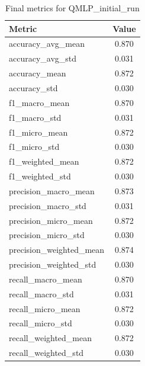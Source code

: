 \documentclass[runningheads]{llncs}
\begin{document}
\begin{table}[t]
\centering
\caption{Final metrics for QMLP\_initial\_run}
\begin{tabular}{lc}
\hline
Metric & Value \\
\hline
accuracy\_avg\_mean & 0.870 \\
accuracy\_avg\_std & 0.031 \\
accuracy\_mean & 0.872 \\
accuracy\_std & 0.030 \\
f1\_macro\_mean & 0.870 \\
f1\_macro\_std & 0.031 \\
f1\_micro\_mean & 0.872 \\
f1\_micro\_std & 0.030 \\
f1\_weighted\_mean & 0.872 \\
f1\_weighted\_std & 0.030 \\
precision\_macro\_mean & 0.873 \\
precision\_macro\_std & 0.031 \\
precision\_micro\_mean & 0.872 \\
precision\_micro\_std & 0.030 \\
precision\_weighted\_mean & 0.874 \\
precision\_weighted\_std & 0.030 \\
recall\_macro\_mean & 0.870 \\
recall\_macro\_std & 0.031 \\
recall\_micro\_mean & 0.872 \\
recall\_micro\_std & 0.030 \\
recall\_weighted\_mean & 0.872 \\
recall\_weighted\_std & 0.030 \\
\hline
\end{tabular}
\end{table}
\end{document}
